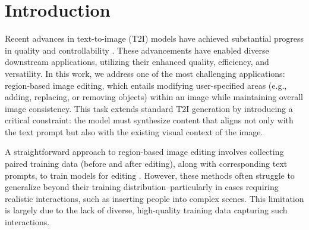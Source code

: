 \documentclass{article}
\newenvironment{cyanpar}{\color{cyan}}{}
\newcommand{\kc}[1]{\textcolor{blue}{#1}}
\begin{document}
\section{Introduction}
\label{Sec:intro}
%



Recent advances in text-to-image (T2I) models have achieved substantial progress in quality and controllability \citep{rombach2022high,betker2023improving,chen2023pixart,esser2024scaling,blackforest2024FLUX}. These advancements have enabled diverse downstream applications, utilizing their enhanced quality, efficiency, and versatility. In this work, we address one of the most challenging applications: {region-based image editing}, which entails modifying user-specified areas (e.g., adding, replacing, or removing objects) within an image while maintaining {overall image consistency}. This task extends standard T2I generation by introducing a critical constraint: the model must synthesize content that aligns not only with the text prompt but also with the existing visual context of the image.





\begin{cyanpar}

A straightforward approach to region-based image editing involves collecting paired training data (before and after editing), along with corresponding text prompts, to train models for editing \citep{brooks2023instructpix2pix, zhang2023magicbrush, wasserman2024paint, li2024brushedit, hui2024hq, wei2024omniedit}. However, these methods often struggle to generalize beyond their training distribution--particularly in cases requiring realistic interactions, such as inserting people into complex scenes. This limitation is largely due to the lack of diverse, high-quality training data capturing such interactions.

\end{cyanpar}
\end{document}
